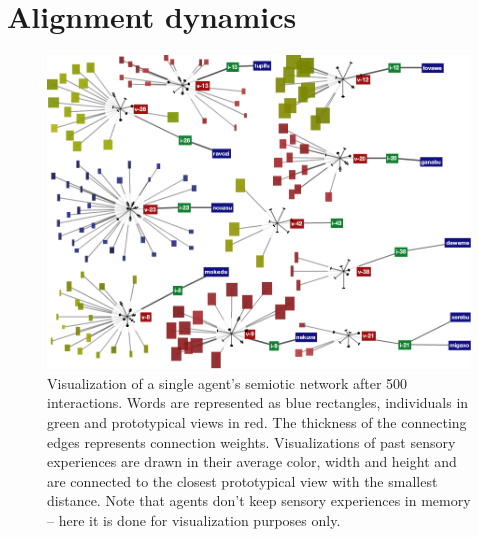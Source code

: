 \section{Alignment dynamics}
\label{s:gng-dynamics}

\begin{figure}[t]
  \centerline{\includegraphics[width=\textwidth]{figures/gng-semiotic-network-example-1}}
  \caption{Visualization of a single agent's semiotic network after
    500 interactions. Words are represented as blue rectangles,
    individuals in green and prototypical views in red. The thickness
    of the connecting edges represents connection
    weights. Visualizations of past sensory experiences are drawn in
    their average color, width and height and are connected to the
    closest prototypical view with the smallest distance. Note that
    agents don't keep sensory experiences in memory -- here it is done
    for visualization purposes only.}
  \label{f:gng-semiotic-network-example-1}
\end{figure}

